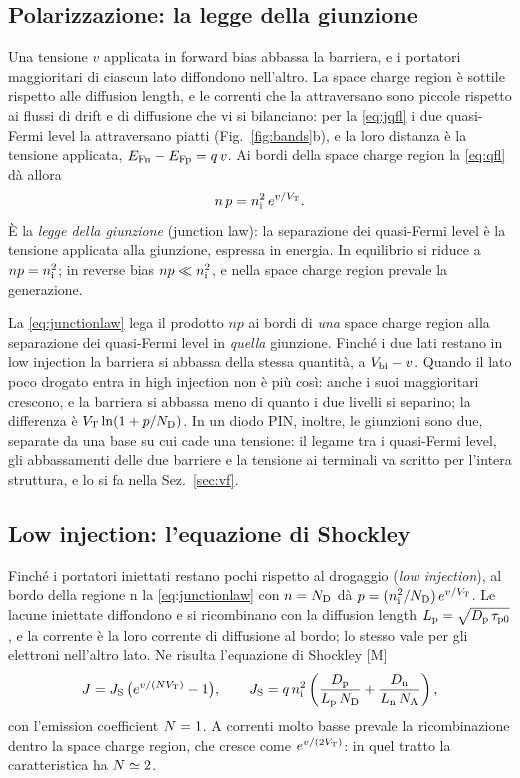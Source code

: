 \documentclass[10pt,a4paper]{scrartcl}
\let\newcommand\pdvaluedefine
\newcommand{\VT}{V_\mathrm{T}}
\newcommand{\Nem}{N}                          %
\newcommand{\ND}{N_\mathrm{D}}
\newcommand{\NA}{N_\mathrm{A}}
\newcommand{\nint}{n_\mathrm{i}}
\newcommand{\Dn}{D_\mathrm{n}}
\newcommand{\Dp}{D_\mathrm{p}}
\newcommand{\Vbi}{V_\mathrm{bi}}
\newcommand{\EFn}{E_\mathrm{Fn}}
\newcommand{\EFp}{E_\mathrm{Fp}}
\begin{document}
\subsection{Polarizzazione: la legge della giunzione}
\label{sec:bias}
Una tensione $v$ applicata in forward bias abbassa la barriera, e i portatori maggioritari di ciascun lato diffondono nell'altro. La space charge region è sottile rispetto alle diffusion length, e le correnti che la attraversano sono piccole rispetto ai flussi di drift e di diffusione che vi si bilanciano: per la \eqref{eq:jqfl} i due quasi-Fermi level la attraversano piatti (Fig.~\ref{fig:bands}b), e la loro distanza è la tensione applicata, $\EFn - \EFp = q\,v$. Ai bordi della space charge region la \eqref{eq:qfl} dà allora
\begin{equation}
n\,p = \nint^2\,e^{v/\VT} .
\label{eq:junctionlaw}
\end{equation}
È la \emph{legge della giunzione} (junction law): la separazione dei quasi-Fermi level è la tensione applicata alla giunzione, espressa in energia. In equilibrio si riduce a $np = \nint^2$; in reverse bias $np \ll \nint^2$, e nella space charge region prevale la generazione.

La \eqref{eq:junctionlaw} lega il prodotto $np$ ai bordi di \emph{una} space charge region alla separazione dei quasi-Fermi level in \emph{quella} giunzione. Finché i due lati restano in low injection la barriera si abbassa della stessa quantità, a $\Vbi - v$. Quando il lato poco drogato entra in high injection non è più così: anche i suoi maggioritari crescono, e la barriera si abbassa meno di quanto i due livelli si separino; la differenza è $\VT\ln(1+p/\ND)$. In un diodo PIN, inoltre, le giunzioni sono due, separate da una base su cui cade una tensione: il legame tra i quasi-Fermi level, gli abbassamenti delle due barriere e la tensione ai terminali va scritto per l'intera struttura, e lo si fa nella Sez.~\ref{sec:vf}.

\subsection{Low injection: l'equazione di Shockley}
\label{sec:shockley}
Finché i portatori iniettati restano pochi rispetto al drogaggio (\emph{low injection}), al bordo della regione n la \eqref{eq:junctionlaw} con $n = \ND$ dà $p = (\nint^2/\ND)\,e^{v/\VT}$. Le lacune iniettate diffondono e si ricombinano con la diffusion length $L_\mathrm{p} = \sqrt{\Dp\,\tau_\mathrm{p0}}$, e la corrente è la loro corrente di diffusione al bordo; lo stesso vale per gli elettroni nell'altro lato. Ne risulta l'equazione di Shockley [M]~\cite{sze}
\begin{equation}
J = J_\mathrm{S}\,\bigl(e^{v/(\Nem\VT)} - 1\bigr) , \qquad
J_\mathrm{S} = q\,\nint^2\left(\frac{\Dp}{L_\mathrm{p}\,\ND} + \frac{\Dn}{L_\mathrm{n}\,\NA}\right) ,
\label{eq:shockley}
\end{equation}
con l'emission coefficient $\Nem = 1$. A correnti molto basse prevale la ricombinazione dentro la space charge region, che cresce come $e^{v/(2\VT)}$: in quel tratto la caratteristica ha $\Nem \simeq 2$.
\end{document}
